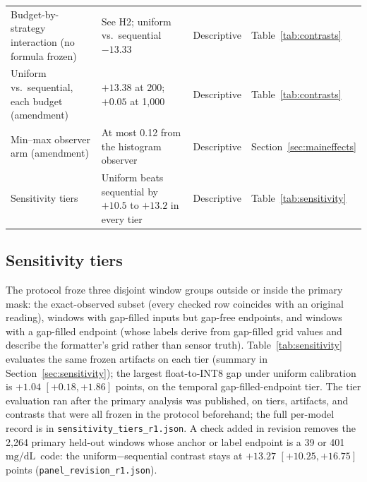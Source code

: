 \documentclass[10pt,twocolumn]{article}
\newcommand{\mgdl}{\ensuremath{\mathrm{mg/dL}}}
\begin{document}
\begin{table}[!tp]
\begin{tabular}{@{}p{}p{}ll@{}}
\raggedright Budget-by-strategy interaction (no formula frozen)
  & \raggedright See H2; uniform vs.\ sequential $-13.33$
  & Descriptive & Table~\ref{tab:contrasts} \\
\raggedright Uniform vs.\ sequential, each budget (amendment)
  & \raggedright $+13.38$ at 200; $+0.05$ at 1,000
  & Descriptive & Table~\ref{tab:contrasts} \\
\raggedright Min--max observer arm (amendment)
  & \raggedright At most 0.12 from the histogram observer
  & Descriptive & Section~\ref{sec:maineffects} \\
\raggedright Sensitivity tiers
  & \raggedright Uniform beats sequential by $+10.5$ to $+13.2$ in every
    tier
  & Descriptive & Table~\ref{tab:sensitivity} \\
\bottomrule
\end{tabular}
\end{table}

\subsection{Sensitivity tiers}

The protocol froze three disjoint window groups outside or inside the
primary mask: the exact-observed subset (every checked row coincides with
an original reading), windows with gap-filled inputs but gap-free
endpoints, and windows with a gap-filled endpoint (whose labels derive
from gap-filled grid values and describe the formatter's grid rather than
sensor truth). Table~\ref{tab:sensitivity} evaluates the same frozen
artifacts on each tier (summary in Section~\ref{sec:sensitivity}); the
largest float-to-INT8 gap under uniform calibration is $+1.04$
$[+0.18, +1.86]$ points, on the temporal gap-filled-endpoint tier. The tier
evaluation ran after the primary analysis was published, on tiers,
artifacts, and contrasts that were all frozen in the protocol beforehand;
the full per-model record is in \texttt{sensitivity\_tiers\_r1.json}. A
check added in revision removes the 2,264 primary held-out windows whose
anchor or label endpoint is a 39 or 401~\mgdl\ code: the
uniform$-$sequential contrast stays at $+13.27$ $[+10.25, +16.75]$ points
(\texttt{panel\_revision\_r1.json}).
\end{document}
